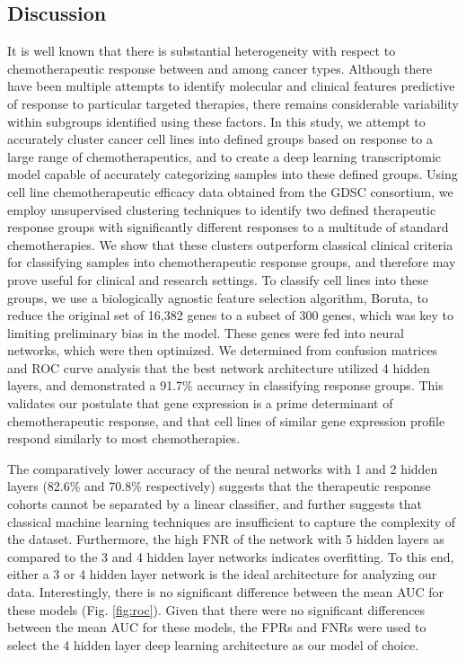 \documentclass[10pt, letterpaper]{article}
\begin{document}
\begin{multicols*}{2}
\section{Discussion}
It is well known that there is substantial heterogeneity with respect to chemotherapeutic response between and among cancer types. Although there have been multiple attempts to identify molecular and clinical features predictive of response to particular targeted therapies, there remains considerable variability within subgroups identified using these factors. In this study, we attempt to accurately cluster cancer cell lines into defined groups based on response to a large range of chemotherapeutics, and to create a deep learning transcriptomic model capable of accurately categorizing samples into these defined groups. Using cell line chemotherapeutic efficacy data obtained from the GDSC consortium, we employ unsupervised clustering techniques to identify two defined therapeutic response groups with significantly different responses to a multitude of standard chemotherapies. We show that these clusters outperform classical clinical criteria for classifying samples into chemotherapeutic response groups, and therefore may prove useful for clinical and research settings. To classify cell lines into these groups, we use a biologically agnostic feature selection algorithm, Boruta, to reduce the original set of 16,382 genes to a subset of 300 genes, which was key to limiting preliminary bias in the model. These genes were fed into neural networks, which were then optimized. We determined from confusion matrices and ROC curve analysis that the best network architecture utilized 4 hidden layers, and demonstrated a 91.7\% accuracy in classifying response groups. This validates our postulate that gene expression is a prime determinant of chemotherapeutic response, and that cell lines of similar gene expression profile respond similarly to most chemotherapies.

The comparatively lower accuracy of the neural networks with 1 and 2 hidden layers (82.6\% and 70.8\% respectively) suggests that the therapeutic response cohorts cannot be separated by a linear classifier, and further suggests that classical machine learning techniques are insufficient to capture the complexity of the dataset. Furthermore, the high FNR of the network with 5 hidden layers as compared to the 3 and 4 hidden layer networks indicates overfitting. To this end, either a 3 or 4 hidden layer network is the ideal architecture for analyzing our data. Interestingly, there is no significant difference between the mean AUC for these models (Fig. \ref{fig:roc}). Given that there were no significant differences between the mean AUC for these models, the FPRs and FNRs were used to select the 4 hidden layer deep learning architecture as our model of choice.


\end{multicols*}
\end{document}
